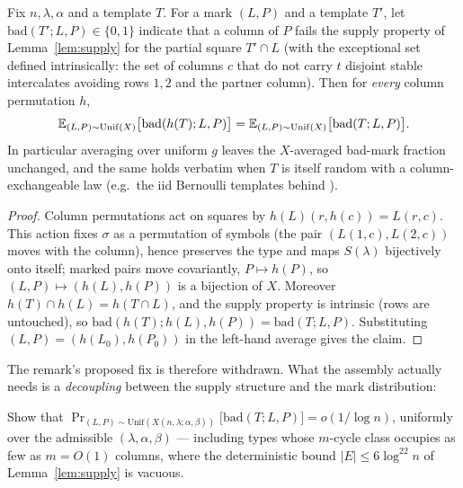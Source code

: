 \begin{proposition}
\label{prop:vacuity}
Fix $n,\lambda,\alpha$ and a template $T$.  For a mark
$(L,P)$ and a template $T'$, let
$\mathrm{bad}(T';L,P)\in\{0,1\}$ indicate that a column of $P$ fails
the supply property of Lemma~\ref{lem:supply} for the partial square
$T'\cap L$ (with the exceptional set defined intrinsically: the set
of columns $c$ that do not carry $t$ disjoint stable intercalates
avoiding rows $1,2$ and the partner column).  Then for
\emph{every} column permutation $h$,
\[
\mathbb{E}_{(L,P)\sim\mathrm{Unif}(X)}\bigl[\mathrm{bad}(h(T);L,P)\bigr]
=\mathbb{E}_{(L,P)\sim\mathrm{Unif}(X)}\bigl[\mathrm{bad}(T;L,P)\bigr].
\]
In particular averaging over uniform $g$ leaves the $X$-averaged
bad-mark fraction unchanged, and the same holds verbatim when $T$ is
itself random with a column-exchangeable law (e.g.\ the iid
Bernoulli templates behind \cite[Lem.~8.3]{KPS25}).
\end{proposition}

\begin{proof}
Column permutations act on squares by $h(L)(r,h(c))=L(r,c)$.  This
action fixes $\sigma$ as a permutation of symbols (the pair
$(L(1,c),L(2,c))$ moves with the column), hence preserves the type
and maps $S(\lambda)$ bijectively onto itself; marked pairs move
covariantly, $P\mapsto h(P)$, so $(L,P)\mapsto(h(L),h(P))$ is a
bijection of $X$.  Moreover $h(T)\cap h(L)=h(T\cap L)$, and the
supply property is intrinsic (rows are untouched), so
$\mathrm{bad}(h(T);h(L),h(P))=\mathrm{bad}(T;L,P)$.  Substituting
$(L,P)=(h(L_0),h(P_0))$ in the left-hand average gives the claim.
\end{proof}

The remark's proposed fix is therefore withdrawn.  What the assembly
actually needs is a \emph{decoupling} between the supply structure
and the mark distribution:

\begin{problem}\label{prob:decouple}
Show that
$\Pr_{(L,P)\sim\mathrm{Unif}(X(n,\lambda;\alpha,\beta))}
\bigl[\mathrm{bad}(T;L,P)\bigr]=o(1/\log n)$, uniformly over the
admissible $(\lambda,\alpha,\beta)$ --- including types whose
$m$-cycle class occupies as few as $m=O(1)$ columns, where the
deterministic bound $|E|\le6\log^{22}n$ of Lemma~\ref{lem:supply} is
vacuous.
\end{problem}

